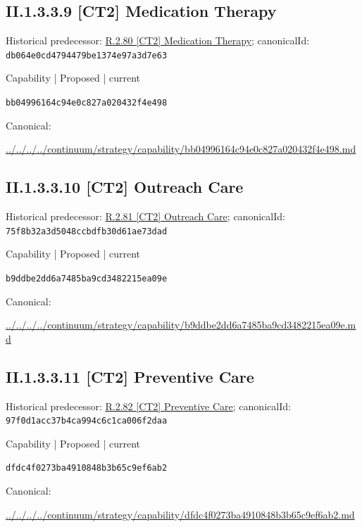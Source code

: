 \documentclass[10pt,a4paper]{article}
\begin{document}
\subsection*{II.1.3.3.9 [CT2] Medication Therapy}
Historical predecessor: \hyperref[element-db064e0cd4794479be1374e97a3d7e63]{R.2.80 [CT2] Medication Therapy}; canonicalId: \texttt{db064e0cd4794479be1374e97a3d7e63}\par
\label{element-bb04996164c94e0c827a020432f4e498}
{\small Capability | Proposed | current}\par
\texttt{bb04996164c94e0c827a020432f4e498}\par
Canonical: \par
{\footnotesize\url{../../../../continuum/strategy/capability/bb04996164c94e0c827a020432f4e498.md}}\par
\subsection*{II.1.3.3.10 [CT2] Outreach Care}
Historical predecessor: \hyperref[element-75f8b32a3d5048ccbdfb30d61ae73dad]{R.2.81 [CT2] Outreach Care}; canonicalId: \texttt{75f8b32a3d5048ccbdfb30d61ae73dad}\par
\label{element-b9ddbe2dd6a7485ba9cd3482215ea09e}
{\small Capability | Proposed | current}\par
\texttt{b9ddbe2dd6a7485ba9cd3482215ea09e}\par
Canonical: \par
{\footnotesize\url{../../../../continuum/strategy/capability/b9ddbe2dd6a7485ba9cd3482215ea09e.md}}\par
\subsection*{II.1.3.3.11 [CT2] Preventive Care}
Historical predecessor: \hyperref[element-97f0d1acc37b4ca994c6c1ca006f2daa]{R.2.82 [CT2] Preventive Care}; canonicalId: \texttt{97f0d1acc37b4ca994c6c1ca006f2daa}\par
\label{element-dfdc4f0273ba4910848b3b65c9ef6ab2}
{\small Capability | Proposed | current}\par
\texttt{dfdc4f0273ba4910848b3b65c9ef6ab2}\par
Canonical: \par
{\footnotesize\url{../../../../continuum/strategy/capability/dfdc4f0273ba4910848b3b65c9ef6ab2.md}}\par
\end{document}
